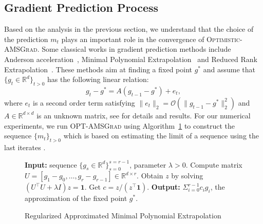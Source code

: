 \documentclass[wcp]{jmlr}
\begin{document}
\subsection{Gradient Prediction Process}

Based on the analysis in the previous section, we understand that the choice of the prediction $m_t$ plays an important role in the convergence of \textsc{Optimistic-AMSGrad}.
Some classical works in gradient prediction methods include Anderson acceleration~\citep{WN11}, Minimal Polynomial Extrapolation~\citep{CJ76} and Reduced Rank Extrapolation~\citep{E79}.
These methods aim at finding a fixed point $g^{*}$ and assume that $\{g_t \in \mathbb R^d\}_{t>0} $ has the following linear relation:
\begin{equation} \label{nox}
g_t - g^* = A( g_{t-1} - g^* ) + e_t,
\end{equation}
where $e_t$ is a second order term satisfying $\| e_t \|_2  = \mathcal{O}( \| g_{t-1} - g^* \|_2^2)$ and $A \in \mathbb R^{d \times d}$ is an unknown matrix, see \citep{SAB16} for details and results.
For our numerical experiments, we run \textsc{OPT-AMSGrad} using Algorithm~\ref{alg:algex} to construct the sequence $\{m_t\}_{t>0}$ which is based on estimating the limit of a sequence using the last iterates \citep{BZ13}.



\begin{figure}\vspace{-0.3in}
\begin{minipage}{\linewidth}
\begin{algorithm}[H]
\begin{algorithmic}[1] 
\small
\caption{Regularized Approximated Minimal Polynomial Extrapolation \citep{SAB16} } \label{alg:algex}
\STATE \textbf{Input:} sequence $\{ g_s \in \mathbb R^d \}_{s=0}^{s=r-1}$, parameter $\lambda > 0$.
\STATE Compute matrix  $U = [ g_1 - g_0, \dots, g_{r} - g_{r-1}] \in \mathbb R^{d \times r}$.
\STATE Obtain $z$ by solving $(U^\top U + \lambda I ) z = \mathbf{1}$.
\STATE Get $c= z / (z^\top \mathbf{1})$.
\STATE \textbf{Output:} $\Sigma_{i=0}^{r-1} c_i g_i$, the approximation of the fixed point $g^*$.
\end{algorithmic}
\end{algorithm}
\end{minipage}\end{figure}
\end{document}
